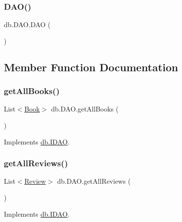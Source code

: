 \subsubsection{\texorpdfstring{D\+A\+O()}{DAO()}}
{\footnotesize\ttfamily db.\+D\+A\+O.\+D\+AO (\begin{DoxyParamCaption}{ }\end{DoxyParamCaption})}



\subsection{Member Function Documentation}
\mbox{\label{classdb_1_1_d_a_o_a82a8c60ccd0de2f70b69bc36d29aeef8}} 
\subsubsection{\texorpdfstring{get\+All\+Books()}{getAllBooks()}}
{\footnotesize\ttfamily List$<$\hyperlink{classserver_1_1data_1_1_book}{Book}$>$ db.\+D\+A\+O.\+get\+All\+Books (\begin{DoxyParamCaption}{ }\end{DoxyParamCaption})}



Implements \hyperlink{interfacedb_1_1_i_d_a_o_a75a5ebcd7c3421ae7cccc8e2f3b2d9f9}{db.\+I\+D\+AO}.

\mbox{\label{classdb_1_1_d_a_o_a4df79c7d44b050aa55451db2ecf342f6}} 
\subsubsection{\texorpdfstring{get\+All\+Reviews()}{getAllReviews()}}
{\footnotesize\ttfamily List$<$\hyperlink{classserver_1_1data_1_1_review}{Review}$>$ db.\+D\+A\+O.\+get\+All\+Reviews (\begin{DoxyParamCaption}{ }\end{DoxyParamCaption})}



Implements \hyperlink{interfacedb_1_1_i_d_a_o_a3d9625d7e5426aad3c2e70fd0174e5f0}{db.\+I\+D\+AO}.

